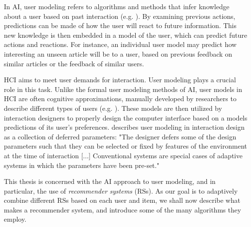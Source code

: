 In AI, user modeling refers to algorithms and methods that infer knowledge about a user based on past interaction 
(e.g. \cite{Pazzani2007, Smyth2007, Alshamri2008, Resnick1994}).
By examining previous actions, predictions can be made of how the user will react to future information. This new knowledge is then embedded in a model of the user, which can predict future actions and reactions. 
For instance, an individual user model may predict how interesting an unseen article will be to a user, based on previous feedback on similar articles or the feedback of similar users.

HCI aims to meet user demands for interaction. 
User modeling plays a crucial role in this task. 
Unlike the formal user modeling methods of AI, user models in HCI are often cognitive approximations, manually developed by researchers to describe different types of users 
(e.g. \cite{Fischer2001, Jameson2009, Cato2001}).
These models are then utilized by interaction designers to properly design the computer interface based on a models predictions of its user's preferences.
\cite{Totterdell1990} describes user modeling in interaction design as a collection of deferred parameters: "The designer defers some of the design parameters such that they can be selected or fixed by features of the environment at the time of interaction [...] Conventional systems are special cases of adaptive systems in which the parameters have been pre-set."

This thesis is concerned with the AI approach to user modeling, and in particular, the use of \emph{recommender systems} (RSs).
As our goal is to adaptively combine different RSs based on each user and item,
we shall now describe what makes a recommender system, and introduce some of the many algorithms they employ.


